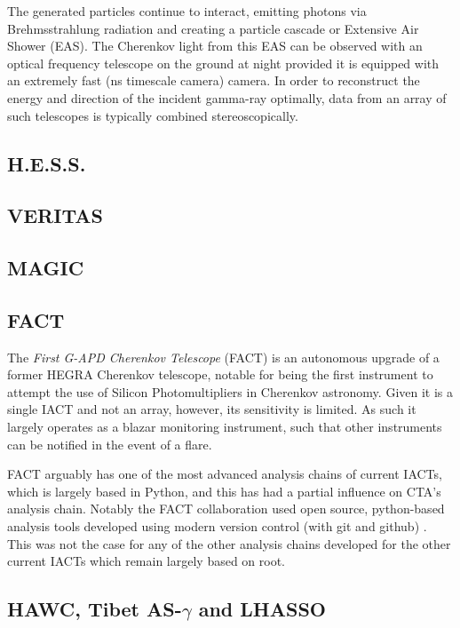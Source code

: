 The generated particles continue to interact, emitting photons via Brehmsstrahlung radiation and creating a particle cascade or Extensive Air Shower (EAS). The Cherenkov light from this EAS can be observed with an optical frequency telescope on the ground at night provided it is equipped with an extremely fast (ns timescale camera) camera. In order to reconstruct the energy and direction of the incident gamma-ray optimally, data from an array of such telescopes is typically combined stereoscopically.

\subsection{H.E.S.S.}
\subsection{VERITAS}
\subsection{MAGIC}
\subsection{FACT}
The \textit{First G-APD Cherenkov Telescope} (FACT) is an autonomous upgrade of a former HEGRA Cherenkov telescope, notable for being the first instrument to attempt the use of Silicon Photomultipliers in Cherenkov astronomy. Given it is a single IACT and not an array, however, its sensitivity is limited. As such it largely operates as a blazar monitoring instrument, such that other instruments can be notified in the event of a flare. 

FACT arguably has one of the most advanced analysis chains of current IACTs, which is largely based in Python, and this has had a partial influence on CTA's analysis chain. Notably the FACT collaboration used open source, python-based analysis tools developed using modern version control (with git and github) \cite{factspec}. This was not the case for any of the other analysis chains developed for the other current IACTs which remain largely based on root.

\subsection{HAWC, Tibet AS-$\gamma$ and LHASSO}

